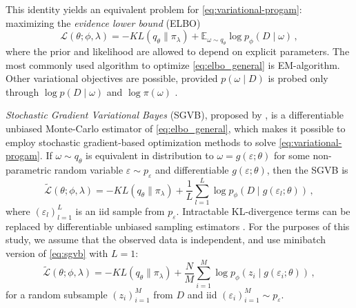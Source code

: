 \documentclass[a4paper,10pt]{article}
\newcommand{\important}[1]{\textbf{\!\colorbox{red}{#1}\!}}
\newcommand{\todo}[1]{{\color{blue} [TODO]} \important{#1}}
\begin{document}
This identity yields an equivalent problem for \eqref{eq:variational-progam}:
maximizing the \textit{evidence lower bound} (ELBO)
\begin{equation}  \label{eq:elbo_general}
  \mathcal{L}(\theta; \phi, \lambda)
    = - KL(q_{\theta} \| \pi_{\lambda})
      + \mathbb{E}_{\omega \sim q_{\theta}}
        \log p_{\phi}(D \mid \omega)
  \,,
\end{equation}
where the prior and likelihood are allowed to depend on explicit parameters. The most
commonly used algorithm to optimize \eqref{eq:elbo_general} is EM-algorithm. Other
variational objectives are possible, provided $p(\omega \mid D)$ is probed only through
$\log p(D \mid \omega)$ and $\log \pi(\omega)$ \citep{ranganath_operator_2018}.

\textit{Stochastic Gradient Variational Bayes} (SGVB), proposed by \citet{kingma_auto-encoding_2014},
is a differentiable unbiased Monte-Carlo estimator of \eqref{eq:elbo_general}, which
makes it possible to employ stochastic gradient-based optimization methods to solve
\eqref{eq:variational-progam}. If $
  \omega \sim q_{\theta}
$ is equivalent in distribution to $
  \omega = g(\varepsilon; \theta)
$ for some non-parametric random variable $
    \varepsilon \sim p_\varepsilon
$ and differentiable $
  g(\varepsilon; \theta)
$, then the SGVB is
\begin{equation}  \label{eq:sgvb}
  \widetilde{\mathcal{L}}(\theta; \phi, \lambda)
    = - KL(q_{\theta} \| \pi_{\lambda})
      + \frac1{L} \sum_{l=1}^L
        \log p_{\phi}(D \mid g(\varepsilon_{l}; \theta))
    \,, 
\end{equation}
where $
  (\varepsilon_{l})_{l=1}^L
$ is an iid sample from $p_\varepsilon$. Intractable KL-divergence terms can be replaced
by differentiable unbiased sampling estimators \citep{kingma_auto-encoding_2014}.
%
For the purposes of this study, we assume that the observed data is independent, and
use minibatch version of \eqref{eq:sgvb} with $L=1$:
\begin{equation}  \label{eq:elbo}
  \widetilde{\mathcal{L}}(\theta; \phi, \lambda)
    = - KL(q_{\theta} \| \pi_{\lambda})
      + \frac{N}{M} \sum_{i=1}^M
        \log p_{\phi}(z_i \mid g(\varepsilon_i; \theta))
    \,,
\end{equation}
for a random subsample $(z_i)_{i=1}^M$ from $D$ and iid $
  (\varepsilon_i)_{i=1}^M \sim p_\varepsilon
$.
%
\end{document}
